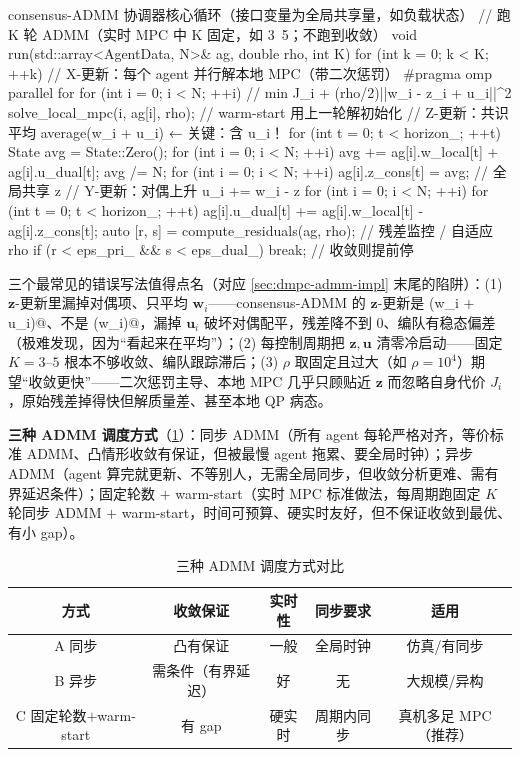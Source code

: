 \begin{codebox}[C++]{consensus-ADMM 协调器核心循环（接口变量为全局共享量，如负载状态）}
// 跑 K 轮 ADMM（实时 MPC 中 K 固定，如 3~5；不跑到收敛）
void run(std::array<AgentData, N>& ag, double rho, int K) {
  for (int k = 0; k < K; ++k) {
    // X-更新：每个 agent 并行解本地 MPC（带二次惩罚）
    #pragma omp parallel for
    for (int i = 0; i < N; ++i)         // min J_i + (rho/2)||w_i - z_i + u_i||^2
      solve_local_mpc(i, ag[i], rho);   // warm-start 用上一轮解初始化
    // Z-更新：共识平均 average(w_i + u_i)  ← 关键：含 u_i！
    for (int t = 0; t < horizon_; ++t) {
      State avg = State::Zero();
      for (int i = 0; i < N; ++i) avg += ag[i].w_local[t] + ag[i].u_dual[t];
      avg /= N;
      for (int i = 0; i < N; ++i) ag[i].z_cons[t] = avg;   // 全局共享 z
    }
    // Y-更新：对偶上升 u_i += w_i - z
    for (int i = 0; i < N; ++i)
      for (int t = 0; t < horizon_; ++t)
        ag[i].u_dual[t] += ag[i].w_local[t] - ag[i].z_cons[t];
    auto [r, s] = compute_residuals(ag, rho);   // 残差监控 / 自适应 rho
    if (r < eps_pri_ && s < eps_dual_) break;    // 收敛则提前停
  }
}
\end{codebox}

\noindent 三个最常见的错误写法值得点名（对应 \cref{sec:dmpc-admm-impl} 末尾的陷阱）：(1) $\mathbf{z}$-更新里漏掉对偶项、只平均 $\mathbf{w}_i$——consensus-ADMM 的 $\mathbf{z}$-更新是 \verb@average(w_i + u_i)@、不是 \verb@average(w_i)@，漏掉 $\mathbf{u}_i$ 破坏对偶配平，残差降不到 $0$、编队有稳态偏差（极难发现，因为“看起来在平均”）；(2) 每控制周期把 $\mathbf{z},\mathbf{u}$ 清零冷启动——固定 $K=3$–$5$ 根本不够收敛、编队跟踪滞后；(3) $\rho$ 取固定且过大（如 $\rho=10^4$）期望“收敛更快”——二次惩罚主导、本地 MPC 几乎只顾贴近 $\mathbf{z}$ 而忽略自身代价 $J_i$，原始残差掉得快但解质量差、甚至本地 QP 病态。

\textbf{三种 ADMM 调度方式}（\cref{tab:dmpc-schedule}）：同步 ADMM（所有 agent 每轮严格对齐，等价标准 ADMM、凸情形收敛有保证，但被最慢 agent 拖累、要全局时钟）；异步 ADMM（agent 算完就更新、不等别人，无需全局同步，但收敛分析更难、需有界延迟条件）；固定轮数 $+$ warm-start（实时 MPC 标准做法，每周期跑固定 $K$ 轮同步 ADMM $+$ warm-start，时间可预算、硬实时友好，但不保证收敛到最优、有小 gap）。

\begin{table}[H]\centering\small
\caption{三种 ADMM 调度方式对比}
\label{tab:dmpc-schedule}
\begin{tabular}{ccccc}
\toprule
方式 & 收敛保证 & 实时性 & 同步要求 & 适用 \\
\midrule
A 同步 & 凸有保证 & 一般 & 全局时钟 & 仿真/有同步 \\
B 异步 & 需条件（有界延迟） & 好 & 无 & 大规模/异构 \\
C 固定轮数$+$warm-start & 有 gap & 硬实时 & 周期内同步 & 真机多足 MPC（推荐） \\
\bottomrule
\end{tabular}
\end{table}

